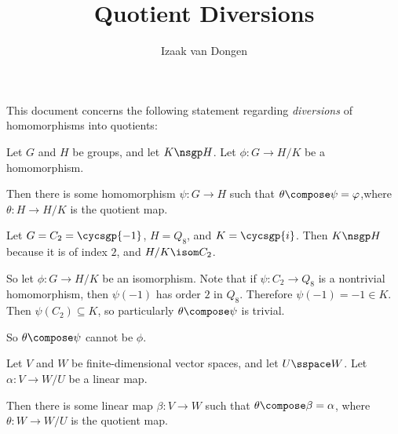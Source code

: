 \documentclass[a4paper,12pt]{article}
\author{Izaak van Dongen}
\title{Quotient Diversions}
\begin{document}
\maketitle

This document concerns the following statement regarding \emph{diversions} of
homomorphisms into quotients:
\begin{tcolorbox}
 Let \(G\) and \(H\) be groups, and let \(K \nsgp H\). Let
 \(\phi: G \to H/K\) be a homomorphism.

 Then there is some homomorphism \(\psi: G \to H\) such that
 \(\theta \compose \psi = \phi\),\footnotemark[1]
 where \(\theta: H \to H/K\) is the quotient map.
\end{tcolorbox}
Let \(G = C_2 = \cycsgp{-1}\), \(H = Q_8\), and \(K = \cycsgp{i}\).
Then \(K \nsgp H\) because it is of index \(2\), and \(H/K \isom C_2\).

So let \(\phi: G \to H/K\) be an isomorphism.
Note that if \(\psi: C_2 \to Q_8\) is a nontrivial homomorphism, then
\(\psi(-1)\) has order \(2\) in \(Q_8\). Therefore \(\psi(-1) = -1 \in K\). Then
\(\psi(C_2) \subseteq K\), so particularly \(\theta \compose \psi\) is trivial.

So \(\theta \compose \psi\) cannot be \(\phi\).

\begin{tcolorbox}
 Let \(V\) and \(W\) be finite-dimensional vector spaces, and let
 \(U \sspace W\). Let \(\alpha: V \to W/U\) be a linear map.

 Then there is some linear map \(\beta: V \to W\) such that
 \(\theta \compose \beta = \alpha\), where \(\theta: W \to W/U\) is the quotient
 map.
\end{tcolorbox}
\end{document}
